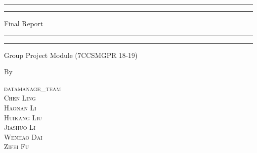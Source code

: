 \documentclass[a4paper,11pt]{article}
\begin{document}
\begin{titlepage} %

	\centering %
	
	\scshape %
	
	\vspace*{\baselineskip} %
	
	
	\rule{\textwidth}{1.6pt}\vspace*{-\baselineskip}\vspace*{2pt} %
	\rule{\textwidth}{0.4pt} %
	
	\vspace{0.75\baselineskip} %
	
	{\LARGE Final Report} %
	
	\vspace{0.75\baselineskip} %
	
	\rule{\textwidth}{0.4pt}\vspace*{-\baselineskip}\vspace{3.2pt} %
	\rule{\textwidth}{1.6pt} %
	
	\vspace{2\baselineskip} %
	
	
	Group Project Module (7CCSMGPR 18-19) %
	
	\vspace*{3\baselineskip} %
	
	
	By
	
	\vspace{0.5\baselineskip} %
	
	{\scshape\Large datamanage\_team \\ Chen Ling \\ Haonan Li \\ Huikang Liu \\ Jiashuo Li \\ Wenhao Dai \\ Zifei Fu \\} %
	

\end{titlepage}
\end{document}
